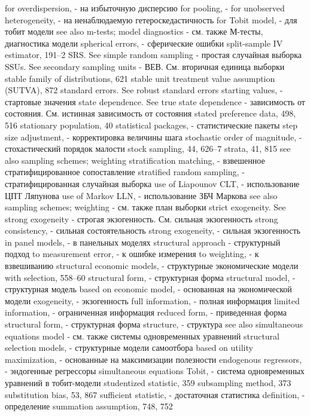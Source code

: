 for overdispersion, - на избыточную дисперсию
for pooling, - 
for unobserved heterogeneity, - на ненаблюдаемую гетероскедастичность
for Tobit model, - для тобит модели
see also m-tests; model diagnostics - см. также М-тесты, диагностика модели
spherical errors, - сферические ошибки
split-sample IV estimator, 191–2
SRS. See simple random sampling - простая случайная выборка
SSUs. See secondary sampling units - ВЕВ. См. вторичная единица выборки
stable family of distributions, 621
stable unit treatment value assumption (SUTVA), 872 standard errors. See robust standard errors
starting values, - стартовые значения
state dependence. See true state dependence - зависимость от состояния. См. истинная зависимость от состояния
stated preference data, 498, 516
stationary population, 40
statistical packages, - статистические пакеты
step size adjustment, - корректировка величины шага
stochastic order of magnitude, - стохастический порядок малости
stock sampling, 44, 626–7
strata, 41, 815
see also sampling schemes; 
weighting stratification matching, - взвешенное стратифицированное сопоставление
stratified random sampling, - стратифицированная случайная выборка
use of Liapounov CLT, - использование ЦПТ Ляпунова
use of Markov LLN, - использование ЗБЧ Маркова
see also sampling schemes; weighting - см. также план выборки
strict exogeneity. See strong exogeneity  - строгая экзогенность. См. сильная экзогенность
strong consistency, - сильная состоятельность
strong exogeneity, - сильная экзогенность
in panel models, - в панельных моделях 
structural approach - структурный подход 
to measurement error, - к ошибке измерения
to weighting, - к взвешиванию
structural economic models, - структурные экономические модели
with selection, 558–60 
structural form, - структурная форма
structural model, - структурная модель 
based on economic model, - основанная на экономической модели
exogeneity, - экзогенность
full information, - полная информация
limited information, - ограниченная информация
reduced form, - приведенная форма 
structural form, - структурная форма
structure, - структура
see also simultaneous equations model - см. также системы одновременных уравнений
structural selection models, - структурные модели самоотбора
based on utility maximization, - основанные на максимизации полезности
endogenous regressors, - эндогенные регрессоры
simultaneous equations Tobit, - система одновременных уравнений в тобит-модели
studentized statistic, 359 subsampling method, 373 substitution bias, 53, 867
sufficient statistic, - достаточная статистика
definition, - определение
summation assumption, 748, 752 
